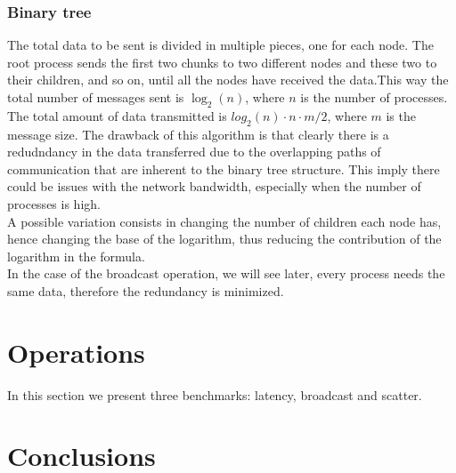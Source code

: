 \subsubsection{Binary tree}
    The total data to be sent is divided in multiple pieces, one
    for each node. The root process sends the first two chunks to
    two different nodes and these two to their children, and so on,
    until all the nodes have received the data.This way the total number
    of messages sent is $\log_2(n)$, where $n$ is the number of processes.
    The total amount of data transmitted is $log_2(n) \cdot n \cdot m/2$,
    where $m$ is the message size. The drawback of this algorithm is that clearly
    there is a redudndancy in the data transferred due to the
    overlapping paths of communication that are inherent to the binary
    tree structure. This imply there could be issues with the network
    bandwidth, especially when the number of processes is high. \\
    A possible variation consists in changing the number of children each
    node has, hence changing the base of the logarithm, thus reducing
    the contribution of the logarithm in the formula.
    \\
    In the case of the broadcast operation, we will see later,
    every process needs the same data, therefore the redundancy
    is minimized.

\section{Operations}
    In this section we present three benchmarks: latency, broadcast
    and scatter. 




    




\section{Conclusions}



